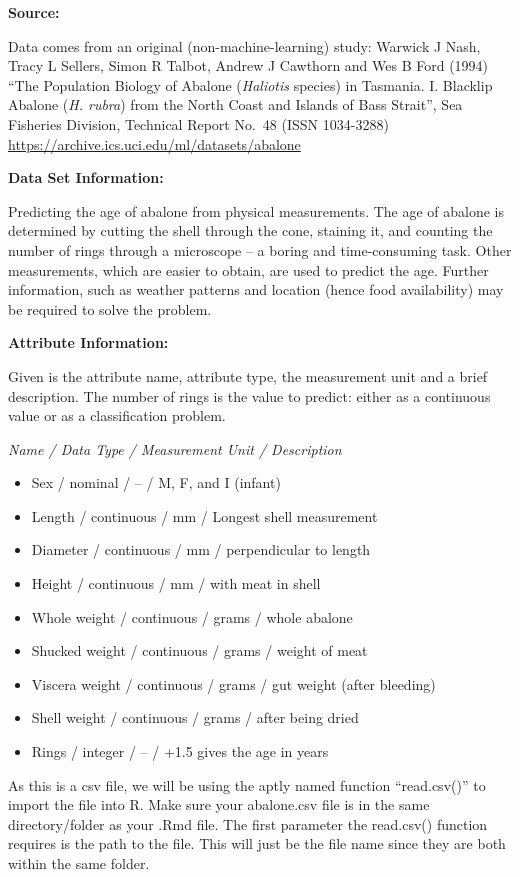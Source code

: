 \documentclass[
]{book}
\providecommand{\tightlist}{%
  \setlength{\itemsep}{0pt}\setlength{\parskip}{0pt}}
\begin{document}
\textbf{Source:}

Data comes from an original (non-machine-learning) study:
Warwick J Nash, Tracy L Sellers, Simon R Talbot, Andrew J Cawthorn and Wes B Ford (1994)
``The Population Biology of Abalone (\emph{Haliotis} species) in Tasmania. I. Blacklip Abalone (\emph{H. rubra}) from the North Coast and Islands of Bass Strait'',
Sea Fisheries Division, Technical Report No.~48 (ISSN 1034-3288)
\url{https://archive.ics.uci.edu/ml/datasets/abalone}

\textbf{Data Set Information:}

Predicting the age of abalone from physical measurements. The age of abalone is determined by cutting the shell through the cone, staining it, and counting the number of rings through a microscope -- a boring and time-consuming task. Other measurements, which are easier to obtain, are used to predict the age. Further information, such as weather patterns and location (hence food availability) may be required to solve the problem.

\textbf{Attribute Information:}

Given is the attribute name, attribute type, the measurement unit and a brief description. The number of rings is the value to predict: either as a continuous value or as a classification problem.

\emph{Name / Data Type / Measurement Unit / Description}

\begin{itemize}
\tightlist
\item
  Sex / nominal / -- / M, F, and I (infant)
\item
  Length / continuous / mm / Longest shell measurement
\item
  Diameter / continuous / mm / perpendicular to length
\item
  Height / continuous / mm / with meat in shell
\item
  Whole weight / continuous / grams / whole abalone
\item
  Shucked weight / continuous / grams / weight of meat
\item
  Viscera weight / continuous / grams / gut weight (after bleeding)
\item
  Shell weight / continuous / grams / after being dried
\item
  Rings / integer / -- / +1.5 gives the age in years
\end{itemize}

As this is a csv file, we will be using the aptly named function ``read.csv()'' to import the file into R. Make sure your abalone.csv file is in the same directory/folder as your .Rmd file. The first parameter the read.csv() function requires is the path to the file. This will just be the file name since they are both within the same folder.
\end{document}
